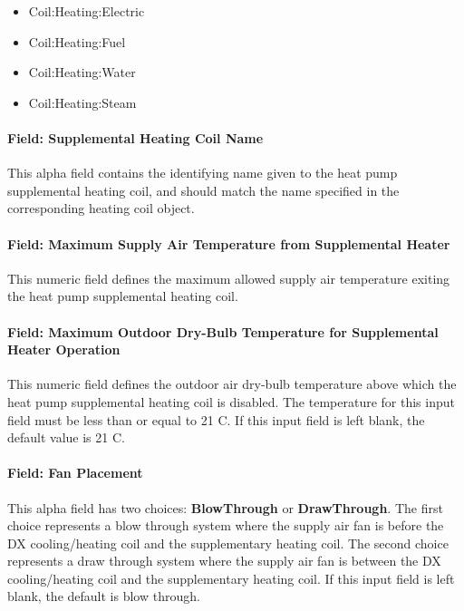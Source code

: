 \begin{itemize}
\item
  Coil:Heating:Electric
\item
  Coil:Heating:Fuel
\item
  Coil:Heating:Water
\item
  Coil:Heating:Steam
\end{itemize}

\paragraph{Field: Supplemental Heating Coil Name}\label{field-supplemental-heating-coil-name-1}

This alpha field contains the identifying name given to the heat pump supplemental heating coil, and should match the name specified in the corresponding heating coil object.

\paragraph{Field: Maximum Supply Air Temperature from Supplemental Heater}\label{field-maximum-supply-air-temperature-from-supplemental-heater}

This numeric field defines the maximum allowed supply air temperature exiting the heat pump supplemental heating coil.

\paragraph{Field: Maximum Outdoor Dry-Bulb Temperature for Supplemental Heater Operation}\label{field-maximum-outdoor-dry-bulb-temperature-for-supplemental-heater-operation-1}

This numeric field defines the outdoor air dry-bulb temperature above which the heat pump supplemental heating coil is disabled. The temperature for this input field must be less than or equal to 21 C. If this input field is left blank, the default value is 21 C.

\paragraph{Field: Fan Placement}\label{field-fan-placement-3}

This alpha field has two choices: \textbf{BlowThrough} or \textbf{DrawThrough}. The first choice represents a blow through system where the supply air fan is before the DX cooling/heating coil and the supplementary heating coil. The second choice represents a draw through system where the supply air fan is between the DX cooling/heating coil and the supplementary heating coil. If this input field is left blank, the default is blow through.

